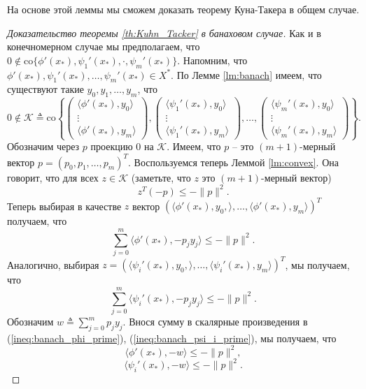 \documentclass[a4paper,12pt]{report}
\begin{document}
На основе этой леммы мы сможем доказать теорему Куна-Такера в общем случае.
\begin{proof}[Доказательство теоремы \ref{th:Kuhn_Tacker} в банаховом случае]
	Как и в конечномерном случае мы предполагаем, что $0\notin \mathrm{co}\{\phi'(x_*),\psi_1'(x_*),\cdot, \psi_m'(x_*)\}.$ Напомним, что $\phi'(x_*),\psi_1'(x_*),\ldots,\psi_m'(x_*)\in X^*$. По Лемме \ref{lm:banach} имеем, что существуют такие $y_0,y_1,\ldots,y_m$, что 
	$$0\notin \mathcal{K}\triangleq  \mathrm{co}\left\{\left(\begin{array}{c}
	\langle \phi'(x_*), y_0\rangle \\ \vdots \\ \langle \phi'(x_*), y_m\rangle	\end{array}\right),\left(\begin{array}{c}
	\langle \psi_1'(x_*), y_0\rangle \\ \vdots \\ \langle \psi_1'(x_*), y_m\rangle	\end{array}\right),\ldots, \left(\begin{array}{c}
	\langle \psi_m'(x_*), y_0\rangle \\ \vdots \\ \langle \psi_m'(x_*), y_m\rangle	\end{array}\right)\right\}.$$ Обозначим через $p$ проекцию $0$ на $\mathcal{K}$. Имеем, что $p$ -- это $(m+1)$-мерный вектор $p=(p_0,p_1,\ldots,p_m)^T$. Воспользуемся теперь Леммой \ref{lm:convex}. Она говорит, что для всех $z\in\mathcal{K}$ (заметьте, что $z$ это $(m+1)$-мерный вектор)
	$$z^T(-p)\leq -\|p\|^2. $$ Теперь выбирая в качестве $z$ вектор $(\langle \phi'(x_*), y_0,\rangle, \ldots,\langle \phi'(x_*),y_m\rangle)^T$ получаем, что
	\begin{equation}\label{ineq:banach_phi_prime}
	\sum_{j=0}^{m}\langle \phi'(x_*),- p_jy_j\rangle\leq -\|p\|^2.
	\end{equation} Аналогично, выбирая $z=(\langle \psi_i'(x_*), y_0,\rangle, \ldots,\langle \psi_i'(x_*),y_m\rangle)^T$, мы получаем, что
	\begin{equation}\label{ineq:banach_psi_i_prime}
	\sum_{j=0}^{m}\langle \psi_i'(x_*),- p_jy_j\rangle\leq -\|p\|^2.
	\end{equation} Обозначим $w\triangleq \sum_{j=0}^{m} p_j y_j$. Внося сумму в скалярные произведения в (\ref{ineq:banach_phi_prime}), (\ref{ineq:banach_psi_i_prime}), мы получаем, что
	\begin{equation}\label{ineq:deriv_phi_banach}
	\langle \phi'(x_*),-w\rangle\leq -\|p\|^2,
	\end{equation}
	\begin{equation}\label{ineq:deriv_psi_i_banach}
	\langle \psi_i'(x_*),-w\rangle\leq -\|p\|^2.
	\end{equation}
\end{proof}
\end{document}
